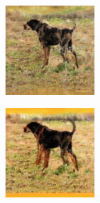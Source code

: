 \documentclass{article}
\begin{document}
\begin{figure}
    \begin{subfigure}[b]{0.5\linewidth}
        \begin{subfigure}[b]{0.242\linewidth}
        \includegraphics[width=\linewidth]{figures/imagenet128/solver_samples/imagenet128_fm_ot_67_05.png}
        \end{subfigure}%
        \begin{subfigure}[b]{0.242\linewidth}
        \includegraphics[width=\linewidth]{figures/imagenet128/solver_samples/imagenet128_fm_ot_67_10.png}

\end{subfigure}
\end{subfigure}
\end{figure}
\end{document}
